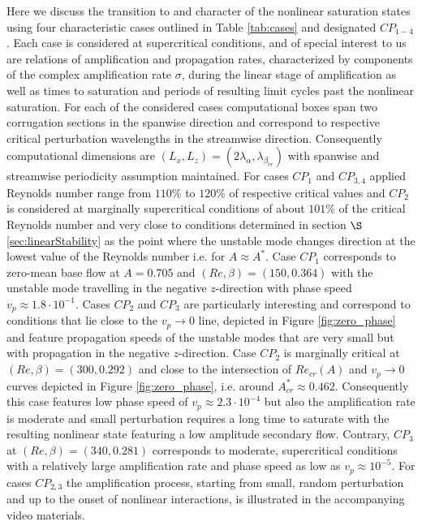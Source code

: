 \documentclass[lineno]{jfm}
\begin{document}
Here we discuss the transition to and character of the nonlinear saturation states using four characteristic cases outlined in Table \ref{tab:cases} and designated $CP_{1-4}$.
Each case is considered at supercritical conditions, and of special interest to us are relations of amplification and propagation rates, characterized by components of the complex amplification rate $\sigma$, during the linear stage of amplification as well as times to saturation and periods of resulting limit cycles past the nonlinear saturation.
For each of the considered cases computational boxes span two corrugation sections in the spanwise direction and correspond to respective critical perturbation wavelengths in the streamwise direction.
Consequently computational dimensions are $(L_x,L_z)=(2\lambda_\alpha, \lambda_{\beta_{cr}})$
with spanwise and streamwise periodicity assumption maintained.
For cases $CP_{1}$ and $CP_{3,4}$ applied Reynolds number range from $110\%$ to $120\%$ of respective critical values and $CP_2$ is considered at marginally supercritical conditions of about $101\%$ of the critical Reynolds number and very close to conditions determined in
section $\S$\ref{sec:linearStability} as the point where the unstable mode changes direction at the lowest value of the Reynolds number i.e. for $A\approx A^*$.
Case $CP_1$ corresponds to zero-mean base flow at $A=0.705$ and $(Re, \beta)=(150, 0.364)$ with the unstable mode travelling in the negative $z$-direction with phase speed $v_p\approx1.8\cdot10^{-1}$.
Cases $CP_2$ and $CP_3$ are particularly interesting and correspond to conditions that lie close to the $v_p\to0$ line, depicted in Figure \ref{fig:zero_phase} and feature propagation speeds of the unstable modes that are very small but with propagation in the negative $z$-direction.
Case $CP_2$ is marginally critical at $(Re, \beta)=(300, 0.292)$ and close to the intersection of $Re_{cr}(A)$ and $v_p\to0$ curves depicted in Figure \ref{fig:zero_phase}, i.e. around $A^{*}_{cr}\approx 0.462$.
Consequently this case features low phase speed of $v_p\approx2.3\cdot10^{-4}$ but also the amplification rate is moderate and small perturbation requires a long time to saturate with the resulting nonlinear state featuring a low amplitude secondary flow.
Contrary, $CP_3$ at $(Re, \beta)=(340, 0.281)$ corresponds to moderate, supercritical conditions with a relatively large amplification rate and phase speed as low as $v_p\approx10^{-5}$.
For cases $CP_{2,3}$ the amplification process, starting from small, random perturbation and up to the onset of nonlinear interactions, is illustrated in the accompanying video materials.
\end{document}
